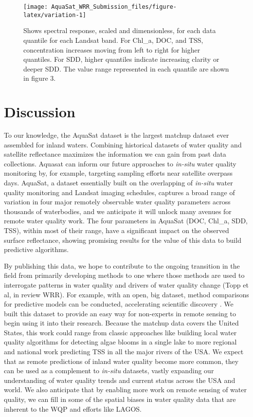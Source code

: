 \documentclass[]{agujournal2018}
\begin{document}
\begin{figure}[h]
\texttt{[image: AquaSat\_WRR\_Submission\_files/figure-latex/variation-1]} \caption{Shows spectral response, scaled and dimensionless, for each data quantile for each Landsat band. For Chl\_a, DOC, and TSS, concentration increases moving from left to right for higher quantiles. For SDD, higher quantiles indicate increasing clarity or deeper SDD. The value range represented in each quantile are shown in figure 3.}\label{fig:variation}
\end{figure}

\section{Discussion}

To our knowledge, the AquaSat dataset is the largest matchup dataset
ever assembled for inland waters. Combining historical datasets of water
quality and satellite reflectance maximizes the information we can gain
from past data collections. Aquasat can inform our future approaches to
\emph{in-situ} water quality monitoring by, for example, targeting
sampling efforts near satellite overpass days. AquaSat, a dataset
essentially built on the overlapping of \emph{in-situ} water quality
monitoring and Landsat imaging schedules, captures a broad range of
variation in four major remotely observable water quality parameters
across thousands of waterbodies, and we anticipate it will unlock many
avenues for remote water quality work. The four parameters in AquaSat
(DOC, Chl\_a, SDD, TSS), within most of their range, have a significant
impact on the observed surface reflectance, showing promising results
for the value of this data to build predictive algorithms.

By publishing this data, we hope to contribute to the ongoing transition
in the field from primarily developing methods to one where those
methods are used to interrogate patterns in water quality and drivers of
water quality change (Topp et al, in review WRR). For example, with an
open, big dataset, method comparisons for predictive models can be
conducted, accelerating scientific discovery \citep{Bukata2013}. We
built this dataset to provide an easy way for non-experts in remote
sensing to begin using it into their research. Because the matchup data
covers the United States, this work could range from classic approaches
like building local water quality algorithms for detecting algae blooms
in a single lake to more regional and national work predicting TSS in
all the major rivers of the USA. We expect that as remote predictions of
inland water quality become more common, they can be used as a
complement to \emph{in-situ} datasets, vastly expanding our
understanding of water quality trends and current status across the USA
and world. We also anticipate that by enabling more work on remote
sensing of water quality, we can fill in some of the spatial biases in
water quality data that are inherent to the WQP and efforts like LAGOS.
\end{document}

